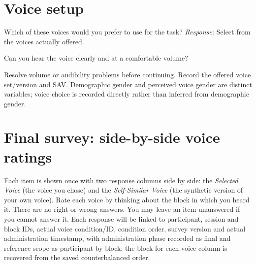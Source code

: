 \section{Voice setup}
\par\medskip\noindent
Which of these voices would you prefer to use for the task?
\textit{Response:} Select from the voices actually offered.\surveywrite
\par\medskip\noindent
Can you hear the voice clearly and at a comfortable volume?
\par\nopagebreak {} Resolve volume or audibility problems before continuing.
Record the offered voice set/version and SAV. Demographic gender and perceived voice gender are distinct variables; voice choice is recorded directly rather than inferred from demographic gender.
\clearpage\section{Final survey: side-by-side voice ratings}
Each item is shown once with two response columns side by side: the \emph{Selected Voice} (the voice you chose) and the \emph{Self-Similar Voice} (the synthetic version of your own voice). Rate each voice by thinking about the block in which you heard it. There are no right or wrong answers. You may leave an item unanswered if you cannot answer it.
Each response will be linked to participant, session and block IDs, actual voice condition/ID, condition order, survey version and actual administration timestamp, with administration phase recorded as final and reference scope as participant-by-block; the block for each voice column is recovered from the saved counterbalanced order.

